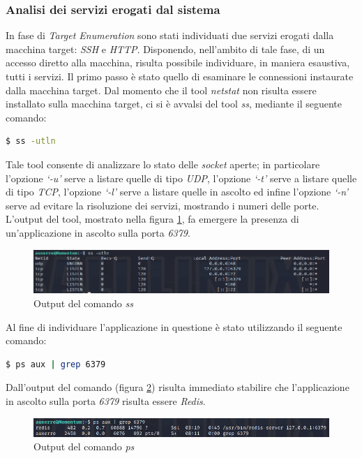 \subsubsection{Analisi dei servizi erogati dal sistema}
In fase di \emph{Target Enumeration} sono stati individuati due servizi erogati dalla macchina target: \emph{SSH} e \emph{HTTP}. Disponendo, nell'ambito di tale fase, di un accesso diretto alla macchina, risulta possibile individuare, in maniera esaustiva, tutti i servizi. Il primo passo è stato quello di esaminare le connessioni instaurate dalla macchina target. Dal momento che il tool \emph{netstat} non risulta essere installato sulla macchina target, ci si è avvalsi del tool \emph{ss}, mediante il seguente comando:
\begin{lstlisting}[language=bash]
    $ ss -utln
\end{lstlisting}
Tale tool consente di analizzare lo stato delle \emph{socket} aperte; in particolare l'opzione \emph{`-u'} serve a listare quelle di tipo \emph{UDP}, l'opzione \emph{`-t'} serve a listare quelle di tipo \emph{TCP}, l'opzione \emph{`-l'} serve a listare quelle in ascolto ed infine l'opzione \emph{`-n'} serve ad evitare la risoluzione dei servizi, mostrando i numeri delle porte. L'output del tool, mostrato nella figura \ref{fig:ss}, fa emergere la presenza di un'applicazione in ascolto sulla porta \emph{6379}.
\begin{figure}[h]
    \centering
    \includegraphics[scale=0.6]{capitoli/images/ss.png}
    \caption{Output del comando \emph{ss}}
    \label{fig:ss}
\end{figure}
Al fine di individuare l'applicazione in questione è stato utilizzando il seguente comando:
\begin{lstlisting}[language=bash]
    $ ps aux | grep 6379
\end{lstlisting}
Dall'output del comando (figura \ref{fig:psaux}) risulta immediato stabilire che l'applicazione in ascolto sulla porta \emph{6379} risulta essere \emph{Redis}. 
\begin{figure}[h]
    \centering
    \includegraphics[scale=0.6]{capitoli/images/psaux.png}
    \caption{Output del comando \emph{ps}}
    \label{fig:psaux}
\end{figure}
